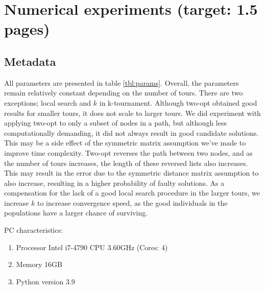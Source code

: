 \documentclass[a4paper,10pt]{article}
\newcommand{\ReplaceMe}[1]{{\color{blue}#1}}
\newcommand{\RemoveMe}[1]{{\color{purple}#1}}
\begin{document}
\section{Numerical experiments (target: 1.5 pages)}

\subsection{Metadata} \label{cha:meta}
	All parameters are presented in table \ref{tbl:params}. Overall, the parameters remain relatively constant depending on the number of tours. There are two exceptions; local search and $k$ in k-tournament. Although two-opt obtained good results for smaller tours, it does not scale to larger tours. We did experiment with applying two-opt to only a subset of nodes in a path, but although less computationally demanding, it did not always result in good candidate solutions. This may be a side effect of the symmetric matrix assumption we've made to improve time complexity. Two-opt reverses the path between two nodes, and as the number of tours increases, the length of these reversed lists also increases. This may result in the error due to the symmetric distance matrix assumption to also increase, resulting in a higher probability of faulty solutions. As a compensation for the lack of a good local search procedure in the larger tours, we increase $k$ to increase convergence speed, as the good individuals in the populations have a larger chance of surviving.




	PC characteristics:
	\begin{enumerate}
		\item Processor Intel i7-4790 CPU \@ 3.60GHz (Cores: 4)
		\item Memory 16GB
		\item Python version 3.9
	\end{enumerate}
	
\end{document}
